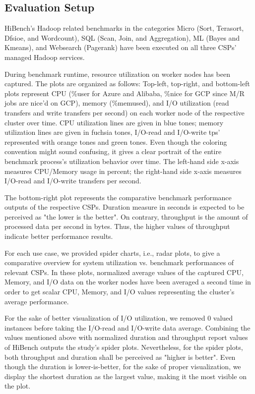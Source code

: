 \documentclass[review]{elsarticle}
\begin{document}
\subsection{Evaluation Setup}
HiBench's Hadoop related benchmarks in the categories Micro (Sort, Terasort, Dfsioe, and Wordcount), SQL (Scan, Join, and Aggregation), ML (Bayes and Kmeans), and Websearch (Pagerank) have been executed on all three CSPs' managed Hadoop services. 

During benchmark runtime, resource utilization on worker nodes has been captured. The plots are organized as follows: Top-left, top-right, and bottom-left plots represent CPU (\%user for Azure and Alibaba, \%nice for GCP since M/R jobs are nice'd on GCP), memory (\%memused), and I/O utilization (read transfers and write transfers per second) on each worker node of the respective cluster over time. CPU utilization lines are given in blue tones; memory utilization lines are given in fuchsia tones, I/O-read and I/O-write tps' represented with orange tones and green tones. Even though the coloring convention might sound confusing, it gives a clear portrait of the entire benchmark process's utilization behavior over time. The left-hand side x-axis measures CPU/Memory usage in percent; the right-hand side x-axis measures I/O-read and I/O-write transfers per second. 

The bottom-right plot represents the comparative benchmark performance outputs of the respective CSPs. Duration measure in seconds is expected to be perceived as "the lower is the better". On contrary, throughput is the amount of processed data per second in bytes. Thus, the higher values of throughput indicate better performance results.

For each use case, we provided spider charts, i.e., radar plots, to give a comparative overview for system utilization vs. benchmark performances of relevant CSPs. In these plots, normalized average values of the captured CPU, Memory, and I/O data on the worker nodes have been averaged a second time in order to get scalar CPU, Memory, and I/O values representing the cluster's average performance. 

For the sake of better visualization of I/O utilization, we removed 0 valued instances before taking the I/O-read and I/O-write data average. Combining the values mentioned above with normalized duration and throughput report values of HiBench outputs the study's spider plots. Nevertheless, for the spider plots, both throughput and duration shall be perceived as "higher is better". Even though the duration is lower-is-better, for the sake of proper visualization, we display the shortest duration as the largest value, making it the most visible on the plot. 
\end{document}
